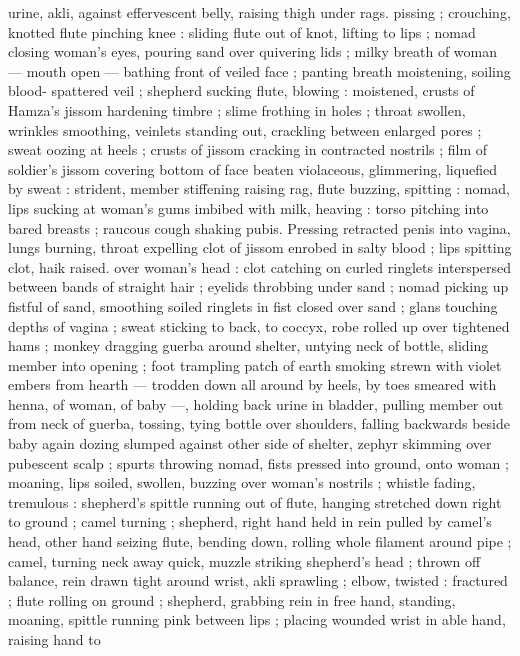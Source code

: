 {urine, akli, against effervescent belly, raising thigh under rags. 
pissing ; crouching, knotted flute pinching knee : sliding flute out of 
knot, lifting to lips ; nomad closing woman's eyes, pouring sand over 
quivering lids ; milky breath of woman --- mouth open --- bathing 
front of veiled face ; panting breath moistening, soiling blood- 
spattered veil ; shepherd sucking flute, blowing : moistened, crusts 
of Hamza's jissom hardening timbre ; slime frothing in holes ; throat 
swollen, wrinkles smoothing, veinlets standing out, crackling 
between enlarged pores ; sweat oozing at heels ; crusts of jissom 
cracking in contracted nostrils ; film of soldier's jissom covering 
bottom of face beaten violaceous, glimmering, liquefied by sweat : 
strident, member stiffening raising rag, flute buzzing, spitting : 
nomad, lips sucking at woman's gums imbibed with milk, heaving : 
torso pitching into bared breasts ; raucous cough shaking pubis. 
Pressing retracted penis into vagina, lungs burning, throat expelling 
clot of jissom enrobed in salty blood ; lips spitting clot, haik raised. 
over woman's head : clot catching on curled ringlets interspersed 
between bands of straight hair ; eyelids throbbing under sand ; 
nomad picking up fistful of sand, smoothing soiled ringlets in fist 
closed over sand ; glans touching depths of vagina ; sweat sticking 
to back, to coccyx, robe rolled up over tightened hams ; monkey 
dragging guerba around shelter, untying neck of bottle, sliding 
member into opening ; foot trampling patch of earth smoking strewn 
with violet embers from hearth --- trodden down all around by heels, 
by toes smeared with henna, of woman, of baby ---, holding back 
urine in bladder, pulling member out from neck of guerba, tossing, 
tying bottle over shoulders, falling backwards beside baby again 
dozing slumped against other side of shelter, zephyr skimming over 
pubescent scalp ; spurts throwing nomad, fists pressed into ground, 
onto woman ; moaning, lips soiled, swollen, buzzing over woman's 
nostrils ; whistle fading, tremulous : shepherd's spittle running out 
of flute, hanging stretched down right to ground ; camel turning ; 
shepherd, right hand held in rein pulled by camel's head, other hand 
seizing flute, bending down, rolling whole filament around pipe ; 
camel, turning neck away quick, muzzle striking shepherd's head ; 
thrown off balance, rein drawn tight around wrist, akli sprawling ; 
elbow, twisted : fractured ; flute rolling on ground ; shepherd, 
grabbing rein in free hand, standing, moaning, spittle running pink 
between lips ; placing wounded wrist in able hand, raising hand to 
}
